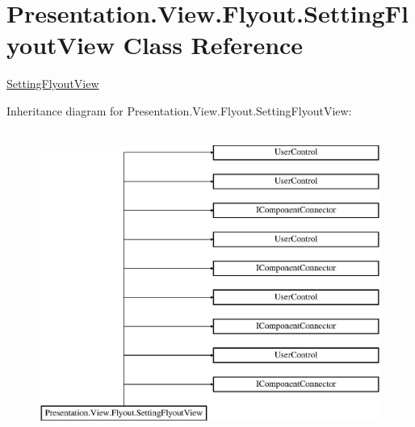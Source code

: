 \hypertarget{class_presentation_1_1_view_1_1_flyout_1_1_setting_flyout_view}{}\section{Presentation.\+View.\+Flyout.\+Setting\+Flyout\+View Class Reference}
\label{class_presentation_1_1_view_1_1_flyout_1_1_setting_flyout_view}


\hyperlink{class_presentation_1_1_view_1_1_flyout_1_1_setting_flyout_view}{Setting\+Flyout\+View}  


Inheritance diagram for Presentation.\+View.\+Flyout.\+Setting\+Flyout\+View\+:\begin{figure}[H]
\begin{center}
\leavevmode
\includegraphics[height=10.000000cm]{class_presentation_1_1_view_1_1_flyout_1_1_setting_flyout_view}
\end{center}
\end{figure}
